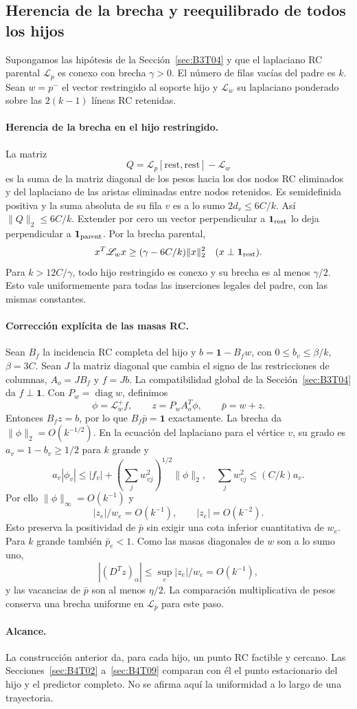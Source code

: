 \subsection{Herencia de la brecha y reequilibrado de todos los hijos}\label{sec:B3T07}
Supongamos las hipótesis de la Sección~\ref{sec:B3T04} y que el laplaciano RC parental
$\mathscr L_p$ es conexo con brecha $\gamma>0$. El número de filas vacías del padre es $k$.
Sean $w=p^-$ el vector restringido al soporte hijo y $\mathscr L_w$
su laplaciano ponderado sobre las $2(k-1)$ líneas RC retenidas.

\paragraph{Herencia de la brecha en el hijo restringido.}
La matriz
\[
 Q=\mathscr L_p[\mathrm{rest},\mathrm{rest}]-\mathscr L_w
\]
es la suma de la matriz diagonal de los pesos hacia los dos nodos RC eliminados
y del laplaciano de las aristas eliminadas entre nodos retenidos.
Es semidefinida positiva y la suma absoluta de su fila $v$ es a lo sumo
$2d_v\le6C/k$. Así $\|Q\|_2\le6C/k$.
Extender por cero un vector perpendicular a $\mathbf1_{\rm rest}$ lo
deja perpendicular a $\mathbf1_{\rm parent}$. Por la brecha parental,
\[
 x^T\mathscr L_wx\ge(\gamma-6C/k)\|x\|_2^2
 \quad(x\perp\mathbf1_{\rm rest}).
\]
Para $k>12C/\gamma$, todo hijo restringido es conexo y su brecha
es al menos $\gamma/2$. Esto vale uniformemente para todas las inserciones
legales del padre, con las mismas constantes.

\paragraph{Corrección explícita de las masas RC.}
Sean $B_f$ la incidencia RC completa del hijo y
$b=\mathbf1-B_fw$, con $0\le b_v\le\beta/k$, $\beta=3C$.
Sean $J$ la matriz diagonal que cambia el signo de las restricciones
de columnas, $A_o=JB_f$ y $f=Jb$.
La compatibilidad global de la Sección~\ref{sec:B3T04} da $f\perp\mathbf1$.
Con $P_w=\operatorname{diag}w$, definimos
\[
 \phi=\mathscr L_w^+f,\qquad z=P_wA_o^T\phi,
 \qquad \bar p=w+z.
\]
Entonces $B_fz=b$, por lo que $B_f\bar p=\mathbf1$ exactamente.
La brecha da $\|\phi\|_2=O(k^{-1/2})$.
En la ecuación del laplaciano para el vértice $v$, su grado es
$a_v=1-b_v\ge1/2$ para $k$ grande y
\[
 a_v|\phi_v|\le |f_v|+
 \left(\sum_jw_{vj}^2\right)^{1/2}\|\phi\|_2,
 \quad \sum_jw_{vj}^2\le(C/k)a_v.
\]
Por ello $\|\phi\|_\infty=O(k^{-1})$ y
\[
 \boxed{|z_e|/w_e=O(k^{-1}),\qquad |z_e|=O(k^{-2}).}
\]
Esto preserva la positividad de $\bar p$ sin exigir una cota inferior
cuantitativa de $w_e$. Para $k$ grande también $\bar p_e<1$.
Como las masas diagonales de $w$ son a lo sumo uno,
\[
 |(D^Tz)_\alpha|\le\sup_e|z_e|/w_e=O(k^{-1}),
\]
y las vacancias de $\bar p$ son al menos $\eta/2$.
La comparación multiplicativa de pesos conserva una brecha uniforme
en $\mathscr L_{\bar p}$ para este paso.

\paragraph{Alcance.}
La construcción anterior da, para cada hijo, un punto RC factible y cercano.
Las Secciones~\ref{sec:B4T02} a~\ref{sec:B4T09} comparan con él el punto estacionario del hijo y el
predictor completo. No se afirma aquí la uniformidad a lo largo de una trayectoria.
